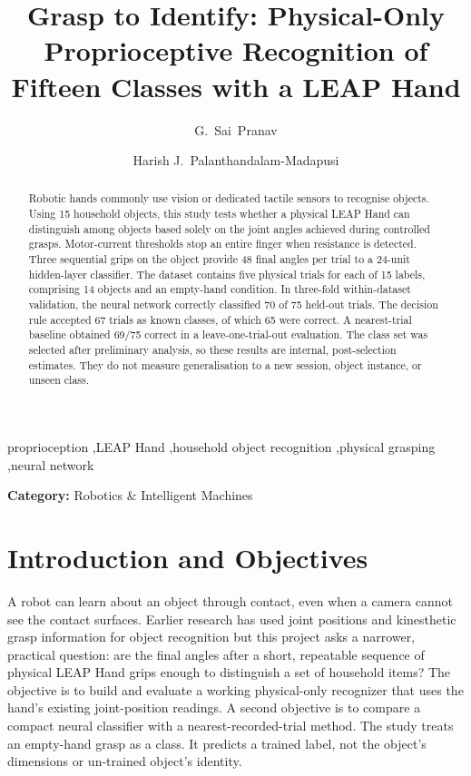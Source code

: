 \documentclass[authoryear,11pt]{elsarticle}
\begin{document}
\begin{frontmatter}

\title{Grasp to Identify: Physical-Only Proprioceptive Recognition
of Fifteen Classes with a LEAP Hand}

\author{G.~Sai~Pranav}
\author{Harish J.~Palanthandalam-Madapusi}

\begin{abstract}
Robotic hands commonly use vision or dedicated tactile sensors to recognise objects. Using 15 household objects, this study tests whether a physical LEAP Hand can distinguish among objects based solely on the joint angles achieved during controlled grasps.  Motor-current thresholds stop an entire finger when resistance is detected.  Three sequential grips on the object provide 48 final angles per trial to a 24-unit hidden-layer classifier. The dataset contains five physical trials for each of 15 labels, comprising 14 objects and an empty-hand condition. In three-fold within-dataset validation, the neural network correctly classified 70 of 75 held-out trials. The decision rule accepted 67 trials as known classes, of which 65 were correct. A nearest-trial baseline obtained 69/75 correct in a leave-one-trial-out evaluation. The class set was selected after preliminary analysis, so these results are internal, post-selection estimates. They do not measure generalisation to a new session, object instance, or unseen class.\end{abstract}

\begin{keyword}
proprioception \sep LEAP Hand \sep household object recognition
\sep physical grasping \sep neural network
\end{keyword}

\end{frontmatter}

\noindent\textbf{Category:} Robotics \& Intelligent Machines

\section{Introduction and Objectives}

A robot can learn about an object through contact, even when a camera
cannot see the contact surfaces. Earlier research has used joint
positions and kinesthetic grasp information for object recognition \citep{Sintov2023, Vasquez2017}
but this project asks a narrower, practical question: are the final
angles after a short, repeatable sequence of physical LEAP Hand grips
enough to distinguish a set of household items? The objective is to
build and evaluate a working physical-only recognizer that uses the
hand's existing joint-position readings. A second objective is to
compare a compact neural classifier with a nearest-recorded-trial
method. The study treats an empty-hand grasp as a class. It predicts
a trained label, not the object's dimensions or un-trained object's identity.
\end{document}
